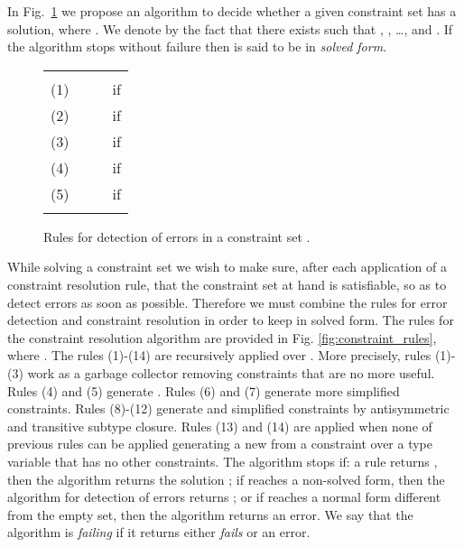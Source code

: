 \documentclass{eptcs}
\begin{document}
In Fig.~\ref{fig:fail_rules} we propose an algorithm to decide whether a given
constraint set  has a solution, where . 
We denote by  the fact that there exists  such that 
, 
, \ldots,
 and .
If the algorithm stops without failure then  is said to
be in {\em solved form}. 
\begin{figure}[h!]
\begin{center}

\begin{tabular}{|clcl|}
        \hline
                &       &       &       \\
        (1)     & 
                &      
                &  if   \\
        (2)     & 
                &      
                &  if   \\
        (3)     & 
                &      
                &  if    \\
        (4)     &   
                &      
                &  if  \\
        (5)     &   
                &      
                &  if  \\
                &       &       &       \\
        \hline
\end{tabular}
\end{center}
\caption{Rules for detection of errors in a constraint set .}
\label{fig:fail_rules}
\end{figure}

While solving a constraint set  we wish to make sure, after each
application of a constraint resolution rule, that the constraint set at hand is
satisfiable, so as to detect
errors as soon as possible. Therefore we must combine the rules for error detection and constraint
resolution in order to keep  in solved form. The rules for the constraint resolution algorithm are provided in Fig.
\ref{fig:constraint_rules}, where . The
rules (1)-(14) are recursively applied over . More precisely, rules (1)-(3) work as a garbage
collector removing constraints that are no more useful. Rules (4) and (5)
generate . Rules (6) and (7) generate more simplified constraints. Rules (8)-(12)
generate  and simplified constraints by antisymmetric and transitive
subtype closure. Rules (13) and (14) are applied when none of previous rules can be applied
generating a new  from a constraint over a type variable that has no
other constraints. The algorithm stops if: a rule returns , then the algorithm returns 
the solution ; if  reaches a non-solved form, then the algorithm for detection of
errors returns ; or if  reaches a normal form different from the empty set,
then the algorithm returns an error. We say that the algorithm is \textit{failing} if it
returns either \textit{fails} or an error.
\end{document}
